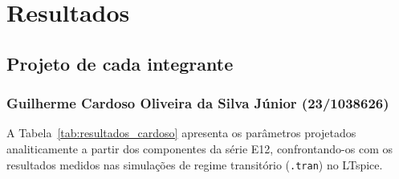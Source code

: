 \documentclass[11pt,a4paper]{article}
\begin{document}
\section{Resultados}



\subsection{Projeto de cada integrante}


\subsubsection{Guilherme Cardoso Oliveira da Silva Júnior (23/1038626)}

A Tabela~\ref{tab:resultados_cardoso} apresenta os parâmetros projetados analiticamente a partir dos componentes da série E12, confrontando-os com os resultados medidos nas simulações de regime transitório (\texttt{.tran}) no LTspice.
\end{document}
